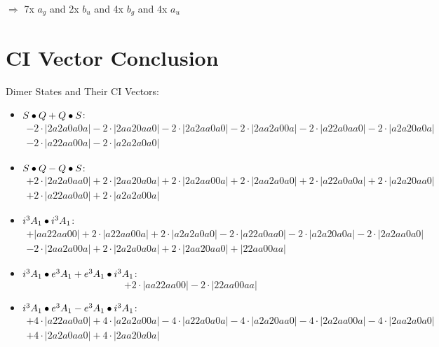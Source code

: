 \documentclass{article}
\begin{document}
$\Rightarrow{}$ 7x $a_{g}$ and 2x $b_u$ and 4x $b_g$ and 4x $a_{u}$


\newpage
\section{CI Vector Conclusion} 
Dimer States and Their CI Vectors:
\begin{itemize}
\item \boldmath$S \bullet Q + Q \bullet S \displaystyle $\unboldmath : \quad$$\begin{array}{c}
-2 \cdot \left|2a2a0a0a\right| -2 \cdot \left|2aa20aa0\right| -2 \cdot \left|2a2aa0a0\right| -2 \cdot \left|2aa2a00a\right| -2 \cdot \left|a22a0aa0\right| -2 \cdot \left|a2a20a0a\right| \\[0.5cm] -2 \cdot \left|a22aa00a\right| -2 \cdot \left|a2a2a0a0\right|
\end{array}$$
\item \boldmath$S \bullet Q - Q \bullet S \displaystyle $\unboldmath : \quad$$\begin{array}{c}
+2 \cdot \left|2a2a0aa0\right| +2 \cdot \left|2aa20a0a\right| +2 \cdot \left|2a2aa00a\right| +2 \cdot \left|2aa2a0a0\right| +2 \cdot \left|a22a0a0a\right| +2 \cdot \left|a2a20aa0\right| \\[0.5cm] +2 \cdot \left|a22aa0a0\right| +2 \cdot \left|a2a2a00a\right|
\end{array}$$
\item \boldmath$i^3 A_1 \bullet i^3 A_1 \displaystyle $\unboldmath : \quad$$\begin{array}{c}
+\left|aa22aa00\right| +2 \cdot \left|a22aa00a\right| +2 \cdot \left|a2a2a0a0\right| -2 \cdot \left|a22a0aa0\right| -2 \cdot \left|a2a20a0a\right| -2 \cdot \left|2a2aa0a0\right| \\[0.5cm] -2 \cdot \left|2aa2a00a\right| +2 \cdot \left|2a2a0a0a\right| +2 \cdot \left|2aa20aa0\right| +\left|22aa00aa\right|
\end{array}$$
\item \boldmath$i^3 A_1 \bullet e^3 A_1 + e^3 A_1 \bullet i^3 A_1 \displaystyle $\unboldmath : \quad$$+2 \cdot \left|aa22aa00\right| -2 \cdot \left|22aa00aa\right|$$
\item \boldmath$i^3 A_1 \bullet e^3 A_1 - e^3 A_1 \bullet i^3 A_1 \displaystyle $\unboldmath : \quad$$\begin{array}{c}
+4 \cdot \left|a22aa0a0\right| +4 \cdot \left|a2a2a00a\right| -4 \cdot \left|a22a0a0a\right| -4 \cdot \left|a2a20aa0\right| -4 \cdot \left|2a2aa00a\right| -4 \cdot \left|2aa2a0a0\right| \\[0.5cm] +4 \cdot \left|2a2a0aa0\right| +4 \cdot \left|2aa20a0a\right|

\end{array}$$
\end{itemize}
\end{document}
